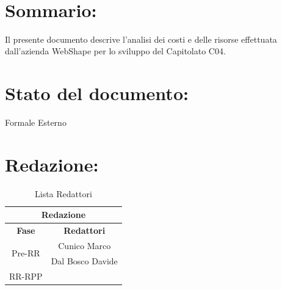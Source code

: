 \newpage

\begin{center} %
	\begin{Huge}	
				\textbf{\TITOLODOC}
			\\
	\end{Huge}
\end{center}

\section*{\LARGE Sommario:}
Il presente documento descrive l'analisi dei costi e delle risorse effettuata dall'azienda WebShape per lo sviluppo del Capitolato C04.

\indent \indent

\section*{\LARGE Stato del documento:}
\indent \indent
	Formale Esterno

\section*{\LARGE Redazione:}
	\begin{table}[!h]
		\begin{center}
			\begin{tabular}
				{|c|c|}
				\hline
				\multicolumn{2}{|c|}{ \textbf{Redazione} } \\
				\hline
				\textbf{Fase} & \textbf{Redattori} \\
				\hline
				\multirow{2}{*}{Pre-RR} & Cunico Marco\\
										& Dal Bosco Davide\\
				\hline
				\multirow{2}{*}{RR-RPP} & \\
										& \\
				\hline
			\end{tabular}
			\caption{Lista Redattori} %
			\label{tabredazione}
		\end{center}
	\end{table}
	
